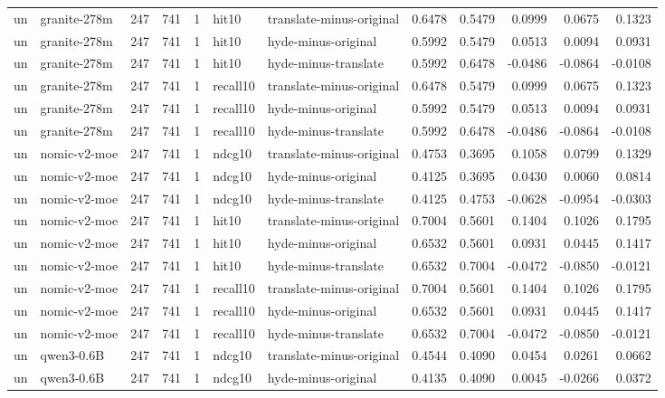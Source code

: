 \begin{tabular}{llrrrllrrrrr}
un & granite-278m & 247 & 741 & 1 & hit10 & translate-minus-original & 0.6478 & 0.5479 & 0.0999 & 0.0675 & 0.1323 \\
un & granite-278m & 247 & 741 & 1 & hit10 & hyde-minus-original & 0.5992 & 0.5479 & 0.0513 & 0.0094 & 0.0931 \\
un & granite-278m & 247 & 741 & 1 & hit10 & hyde-minus-translate & 0.5992 & 0.6478 & -0.0486 & -0.0864 & -0.0108 \\
un & granite-278m & 247 & 741 & 1 & recall10 & translate-minus-original & 0.6478 & 0.5479 & 0.0999 & 0.0675 & 0.1323 \\
un & granite-278m & 247 & 741 & 1 & recall10 & hyde-minus-original & 0.5992 & 0.5479 & 0.0513 & 0.0094 & 0.0931 \\
un & granite-278m & 247 & 741 & 1 & recall10 & hyde-minus-translate & 0.5992 & 0.6478 & -0.0486 & -0.0864 & -0.0108 \\
un & nomic-v2-moe & 247 & 741 & 1 & ndcg10 & translate-minus-original & 0.4753 & 0.3695 & 0.1058 & 0.0799 & 0.1329 \\
un & nomic-v2-moe & 247 & 741 & 1 & ndcg10 & hyde-minus-original & 0.4125 & 0.3695 & 0.0430 & 0.0060 & 0.0814 \\
un & nomic-v2-moe & 247 & 741 & 1 & ndcg10 & hyde-minus-translate & 0.4125 & 0.4753 & -0.0628 & -0.0954 & -0.0303 \\
un & nomic-v2-moe & 247 & 741 & 1 & hit10 & translate-minus-original & 0.7004 & 0.5601 & 0.1404 & 0.1026 & 0.1795 \\
un & nomic-v2-moe & 247 & 741 & 1 & hit10 & hyde-minus-original & 0.6532 & 0.5601 & 0.0931 & 0.0445 & 0.1417 \\
un & nomic-v2-moe & 247 & 741 & 1 & hit10 & hyde-minus-translate & 0.6532 & 0.7004 & -0.0472 & -0.0850 & -0.0121 \\
un & nomic-v2-moe & 247 & 741 & 1 & recall10 & translate-minus-original & 0.7004 & 0.5601 & 0.1404 & 0.1026 & 0.1795 \\
un & nomic-v2-moe & 247 & 741 & 1 & recall10 & hyde-minus-original & 0.6532 & 0.5601 & 0.0931 & 0.0445 & 0.1417 \\
un & nomic-v2-moe & 247 & 741 & 1 & recall10 & hyde-minus-translate & 0.6532 & 0.7004 & -0.0472 & -0.0850 & -0.0121 \\
un & qwen3-0.6B & 247 & 741 & 1 & ndcg10 & translate-minus-original & 0.4544 & 0.4090 & 0.0454 & 0.0261 & 0.0662 \\
un & qwen3-0.6B & 247 & 741 & 1 & ndcg10 & hyde-minus-original & 0.4135 & 0.4090 & 0.0045 & -0.0266 & 0.0372 \\

\end{tabular}
